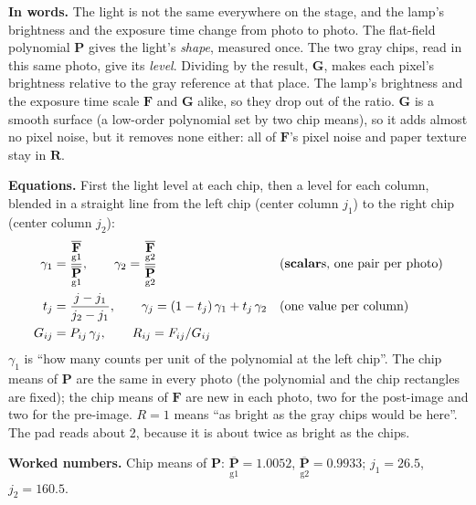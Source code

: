 \documentclass[11pt,letter]{article}
\newcommand{\SCALAR}{\textbf{scalar}}
\newcommand{\mF}{\mathbf{F}}   %
\newcommand{\mP}{\mathbf{P}}   %
\newcommand{\mG}{\mathbf{G}}   %
\newcommand{\mR}{\mathbf{R}}   %
\newcommand{\reg}[2]{\underset{\text{#1}}{#2}}
\newcommand{\avg}[2]{\overline{\reg{#1}{#2}}}
\begin{document}
\textbf{In words.}  The light is not the same everywhere on the stage, and
the lamp's brightness and the exposure time change from photo to photo.
The flat-field polynomial $\mP$ gives the light's \emph{shape}, measured
once.  The two gray chips, read in this same photo, give its \emph{level}.
Dividing by the result, $\mG$, makes each pixel's brightness relative to the
gray reference at that place.  The lamp's brightness and the exposure time
scale $\mF$ and $\mG$ alike, so they drop out of the ratio.  $\mG$ is a
smooth surface (a low-order polynomial set by two chip means), so it adds
almost no pixel noise, but it removes none either: all of $\mF$'s pixel
noise and paper texture stay in $\mR$.

\textbf{Equations.}  First the light level at each chip, then a level for
each column, blended in a straight line from the left chip (center column
$j_1$) to the right chip (center column $j_2$):
\begin{align}
  \gamma_1 &= \frac{\avg{g1}{\mF}}{\avg{g1}{\mP}}, \qquad
  \gamma_2 = \frac{\avg{g2}{\mF}}{\avg{g2}{\mP}}
    && \text{(\SCALAR{}s, one pair per photo)} \\
  t_j &= \frac{j - j_1}{j_2 - j_1}, \qquad
  \gamma_j = (1 - t_j)\,\gamma_1 + t_j\,\gamma_2
    && \text{(one value per column)} \\
  G_{ij} &= P_{ij}\,\gamma_j, \qquad R_{ij} = F_{ij} / G_{ij}
\end{align}
$\gamma_1$ is ``how many counts per unit of the polynomial at the left
chip''.  The chip means of $\mP$ are the same in every photo (the polynomial
and the chip rectangles are fixed); the chip means of $\mF$ are new in each
photo, two for the post-image and two for the pre-image.  $R = 1$ means ``as
bright as the gray chips would be here''.  The pad reads about 2, because
it is about twice as bright as the chips.

\textbf{Worked numbers.}  Chip means of $\mP$: $\avg{g1}{\mP} = 1.0052$,
$\avg{g2}{\mP} = 0.9933$; $j_1 = 26.5$, $j_2 = 160.5$.
\end{document}
